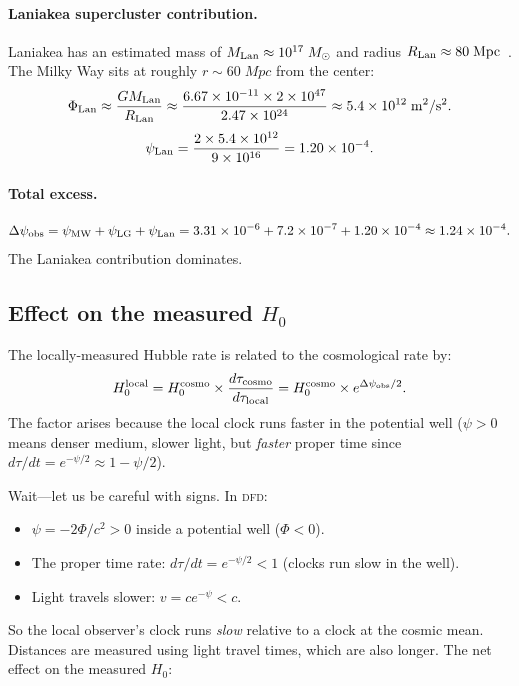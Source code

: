 \documentclass[aps,prd,twocolumn,superscriptaddress,nofootinbib,longbibliography]{revtex4-2}
\newcommand{\DFD}{\textsc{dfd}}
\begin{document}
\paragraph{Laniakea supercluster contribution.}
Laniakea has an estimated mass of $M_{\rm Lan} \approx 10^{17}\;M_\odot$
and radius $R_{\rm Lan} \approx 80\;\si{Mpc}$~\cite{Tully2014}. The
Milky Way sits at roughly $r \sim 60\;\si{Mpc}$ from the center:
\begin{equation}
\Phi_{\rm Lan} \approx \frac{GM_{\rm Lan}}{R_{\rm Lan}}
\approx \frac{6.67\times10^{-11}\times 2\times10^{47}}{2.47\times10^{24}}
\approx 5.4\times10^{12}\;\si{m^2/s^2}.
\end{equation}
\begin{equation}
\psi_{\rm Lan} = \frac{2\times5.4\times10^{12}}{9\times10^{16}} = 1.20\times10^{-4}.
\end{equation}

\paragraph{Total excess.}
\begin{equation}\label{eq:psi-total}
\Delta\psi_{\rm obs} = \psi_{\rm MW} + \psi_{\rm LG} + \psi_{\rm Lan}
= 3.31\times10^{-6} + 7.2\times10^{-7} + 1.20\times10^{-4}
\approx 1.24\times10^{-4}.
\end{equation}
The Laniakea contribution dominates.

\subsection{Effect on the measured $H_0$}\label{sec:H0-correction}

The locally-measured Hubble rate is related to the cosmological rate by:
\begin{equation}\label{eq:H0-relation}
H_0^{\rm local} = H_0^{\rm cosmo}\times\frac{d\tau_{\rm cosmo}}{d\tau_{\rm local}}
= H_0^{\rm cosmo}\times e^{\Delta\psi_{\rm obs}/2}.
\end{equation}
The factor arises because the local clock runs faster in the potential
well ($\psi > 0$ means denser medium, slower light, but \emph{faster}
proper time since $d\tau/dt = e^{-\psi/2} \approx 1 - \psi/2$).

Wait---let us be careful with signs. In \DFD:
\begin{itemize}
\item $\psi = -2\Phi/c^2 > 0$ inside a potential well ($\Phi < 0$).
\item The proper time rate: $d\tau/dt = e^{-\psi/2} < 1$ (clocks run slow in the well).
\item Light travels slower: $v = ce^{-\psi} < c$.
\end{itemize}
So the local observer's clock runs \emph{slow} relative to a clock at
the cosmic mean. Distances are measured using light travel times, which
are also longer. The net effect on the measured $H_0$:
\end{document}
